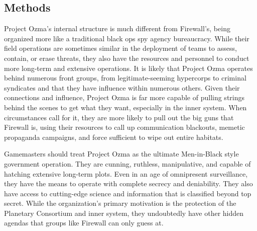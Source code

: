 \subsection{Methods }

Project Ozma's internal structure is much different 
from Firewall's, being organized more like a traditional
black ops spy agency bureaucracy. While their field
operations are sometimes similar in the deployment 
of teams to assess, contain, or erase threats, they also 
have the resources and personnel to conduct more 
long-term and extensive operations. It is likely that 
Project Ozma operates behind numerous front groups, 
from legitimate-seeming hypercorps to criminal syndicates
and that they have influence within numerous
others. Given their connections and influence, Project 
Ozma is far more capable of pulling strings behind the 
scenes to get what they want, especially in the inner 
system. When circumstances call for it, they are more 
likely to pull out the big guns that Firewall is, using 
their resources to call up communication blackouts, 
memetic propaganda campaigns, and force sufficient 
to wipe out entire habitats.

Gamemasters should treat Project Ozma as the ultimate
Men-in-Black style government operation. They
are cunning, ruthless, manipulative, and capable of 
hatching extensive long-term plots. Even in an age of 
omnipresent surveillance, they have the means to operate
with complete secrecy and deniability. They also
have access to cutting-edge science and information 
that is classified beyond top secret. While the organization's
primary motivation is the protection of
the Planetary Consortium and inner system, they 
undoubtedly have other hidden agendas that groups 
like Firewall can only guess at. 

